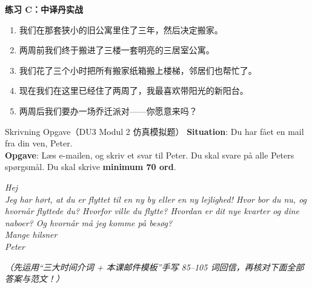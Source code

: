 \textbf{练习 C：中译丹实战}
\begin{enumerate}
  \item 我们在那套狭小的旧公寓里住了三年，然后决定搬家。
  \item 两周前我们终于搬进了三楼一套明亮的三居室公寓。
  \item 我们花了三个小时把所有搬家纸箱搬上楼梯，邻居们也帮忙了。
  \item 现在我们在这里已经住了两周了，我最喜欢带阳光的新阳台。
  \item 两周后我们要办一场乔迁派对——你愿意来吗？
\end{enumerate}


\begin{emailbox}{Skrivning Opgave（DU3 Modul 2 仿真模拟题）}
\textbf{Situation}: Du har fået en mail fra din ven, Peter.\\
\textbf{Opgave}: Læs e-mailen, og skriv et svar til Peter. Du skal svare på alle Peters spørgsmål. Du skal skrive \textbf{minimum 70 ord}.

\vspace{0.3em}
\textit{Hej\\
Jeg har hørt, at du er flyttet til en ny by eller en ny lejlighed! Hvor bor du nu, og hvornår flyttede du? Hvorfor ville du flytte? Hvordan er dit nye kvarter og dine naboer? Og hvornår må jeg komme på besøg?\\
Mange hilsner\\
Peter}
\end{emailbox}

\textit{（先运用“三大时间介词 + 本课邮件模板”手写 85--105 词回信，再核对下面全部答案与范文！）}

